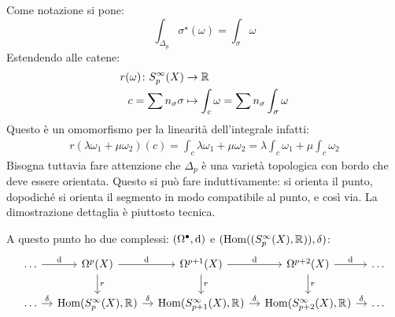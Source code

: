 Come notazione si pone:
\[
  \int_{\Delta_p} \sigma^\star(\omega) = \int_\sigma \omega
\]
Estendendo alle catene:
\begin{align*}
  r(\omega) \colon S_p^\infty(X) & \to \mathbb{R}^{} \\
  c = \sum n_\sigma \sigma & \mapsto \int_c \omega = \sum n_\sigma \int_\sigma \omega
\end{align*}
Questo è un omomorfismo per la linearità dell'integrale infatti:
\begin{gather*}
  r(\lambda \omega_1 + \mu \omega_2)(c) = \int_c \lambda \omega_1 + \mu \omega_2 = \lambda \int_c \omega_1 + \mu \int_c \omega_2
\end{gather*}
Bisogna tuttavia fare attenzione che $ \Delta_p $ è una varietà topologica con bordo
che deve essere orientata. Questo si può fare induttivamente: si orienta il
punto, dopodiché si orienta il segmento in modo compatibile al punto, e così
via. La dimostrazione dettaglia è piuttosto tecnica.

A questo punto ho due complessi: $ (\Omega^\bullet, \operatorname{d}\!{}) $ e $ (\mathrm{Hom}( (S^\infty_p(X), \mathbb{R}^{})), \delta) $:
\[
  \begin{tikzcd}[nodes = {column sep = 10 pt}]
    \dots \rar{\d{}} & \Omega^p(X) \dar{r} \rar{\d{}} & \Omega^{p+1}(X)  \dar{r} \rar{\d{}} & \Omega^{p+2}(X)  \dar{r} \rar{\d{}} & \dots \\
    \dots \rar{\delta} & \hom{S^\infty_p(X), \RN{}} \rar{\delta} & \hom{S^\infty_{p+1}(X), \RN{}} \rar{\delta} &\hom{S^\infty_{p+2}(X), \RN{}} \rar{\delta} & \dots
  \end{tikzcd}
\]

